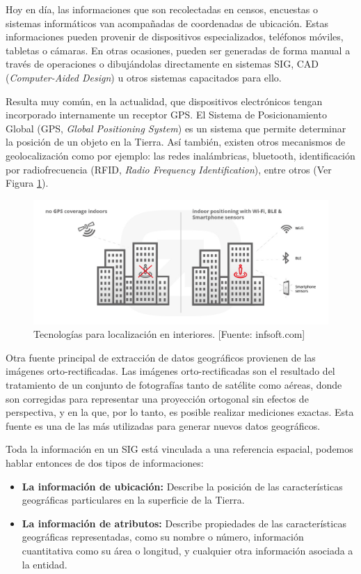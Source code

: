 Hoy en día, las informaciones que son recolectadas en censos, encuestas o sistemas informáticos van acompañadas de coordenadas de ubicación. Estas informaciones pueden provenir de dispositivos especializados, teléfonos móviles, tabletas o cámaras. En otras ocasiones, pueden ser generadas de forma manual a través de operaciones o dibujándolas directamente en sistemas SIG, CAD (\textit{Computer-Aided Design}) u otros sistemas capacitados para ello.

Resulta muy común, en la actualidad, que dispositivos electrónicos tengan incorporado internamente un receptor GPS. El Sistema de Posicionamiento Global (GPS, \textit{Global Positioning System}) es un sistema que permite determinar la posición de un objeto en la Tierra. Así también, existen otros mecanismos de geolocalización como por ejemplo: las redes inalámbricas, bluetooth, identificación por radiofrecuencia (RFID, \textit{Radio Frequency Identification}), entre otros (Ver Figura \ref{fig:interioresTech}).

\begin{figure}[H]
    \centering
    \includegraphics[width=14.5cm]{Indoor_tech.jpg}
    \caption{Tecnologías para localización en interiores. [Fuente: infsoft.com]}
    \label{fig:interioresTech}
\end{figure}

Otra fuente principal de extracción de datos geográficos provienen de las imágenes orto-rectificadas. Las imágenes orto-rectificadas son el resultado del tratamiento de un conjunto de fotografías tanto de satélite como aéreas, donde son corregidas para representar una proyección ortogonal sin efectos de perspectiva, y en la que, por lo tanto, es posible realizar mediciones exactas. Esta fuente es una de las más utilizadas para generar nuevos datos geográficos.

Toda la información en un SIG está vinculada a una referencia espacial, podemos hablar entonces de dos tipos de informaciones: 
\begin{itemize}
    \item \textbf{La información de ubicación:} 
    Describe la posición de las características geográficas particulares en la superficie de la Tierra.
    \item \textbf{La información de atributos:} 
    Describe propiedades de las características geográficas representadas, como su nombre o número, información cuantitativa como su área o longitud, y cualquier otra información asociada a la entidad.
\end{itemize}

